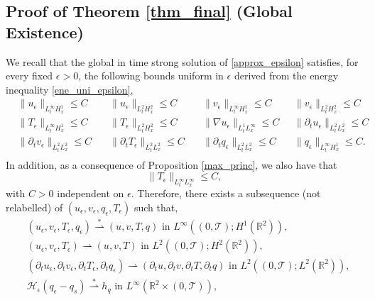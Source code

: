 \documentclass[11pt, a4paper, article,reqno,]{amsart}
\theoremstyle{remark}
\numberwithin{equation}{section}
\begin{document}
\subsection{Proof of Theorem \ref{thm_final} (Global Existence)}\label{existence}
We recall that the global in time strong solution of \eqref{approx_epsilon} satisfies, for every fixed $\epsilon > 0$, the following bounds uniform in $\epsilon$ derived from the energy inequality \eqref{ene_uni_epsilon},
\begin{equation}\label{uniboundeps}
    \begin{aligned}
        & \|u_{\epsilon}\|_{L^{\infty}_t H^1_x} \leq C & \|u_{\epsilon}\|_{L^{2}_t H^2_x} \leq C \quad  & \|v_{\epsilon}\|_{L^{\infty}_t H^1_x} \leq C  & \|v_{\epsilon}\|_{L^{2}_t H^2_x} \leq C \\
        &\|T_{\epsilon}\|_{L^{\infty}_t H^1_x} \leq C & \|T_{\epsilon}\|_{L^{2}_t H^2_x} \leq C  \quad  & \| \nabla u_{\epsilon} \|_{L^{1}_t L^{\infty}_x} \leq C & \|\partial_t u_{\epsilon}\|_{L^{2}_t L^{2}_x} \leq C \\
        & \|\partial_t v_{\epsilon}\|_{L^{2}_t L^{2}_x} \leq C \quad & \|\partial_t T_{\epsilon}\|_{L^{2}_t L^{2}_x} \leq C \quad & \|\partial_t q_{\epsilon}\|_{L^{2}_t L^{2}_x} \leq C \quad & \|q_{\epsilon}\|_{L^{\infty}_t H^1_x} \leq C. \\
    \end{aligned}
\end{equation}
In addition, as a consequence of Proposition \ref{max_princ}, we also have that
\begin{equation}\label{eq:linftyt}
\|T_{\epsilon}\|_{L^{\infty}_t L^{\infty}_x}\leq C,
\end{equation}
with $C>0$ independent on $\epsilon$. 
Therefore, there exists a subsequence (not relabelled) of $(u_\epsilon,v_\epsilon,q_\epsilon, T_{ \epsilon})$ such that,
\begin{equation}\label{conv_eps}
\begin{aligned}
    & (u_{\epsilon},v_{\epsilon}, T_{\epsilon},q_{\epsilon}) \overset{\ast}{\rightharpoonup} (u,v,T,q) \text{ in } L^{\infty}((0,\mathcal{T});H^1( \mathbb{R}^2)), \\
    & (u_{\epsilon},v_{\epsilon},T_{\epsilon}) \overset{}{\rightharpoonup} (u,v,T) \text{ in } L^{2}((0,\mathcal{T});H^2( \mathbb{R}^2)),\\
    &  (\partial_t u_{\epsilon}, \partial_t v_{\epsilon}, \partial_t T_{\epsilon}, \partial_t q_{\epsilon}) \overset{}{\rightharpoonup} (\partial_t u, \partial_t v, \partial_t T, \partial_t q) \text{ in } L^{2}((0,\mathcal{T});L^2( \mathbb{R}^2)),\\
    & \mathcal{H}_\epsilon(q_\epsilon - q_s) \overset{\ast}{\rightharpoonup} h_q \text{ in } L^{\infty}(\mathbb{R}^2 \times (0,\mathcal{T})),
\end{aligned}
\end{equation}
\end{document}
